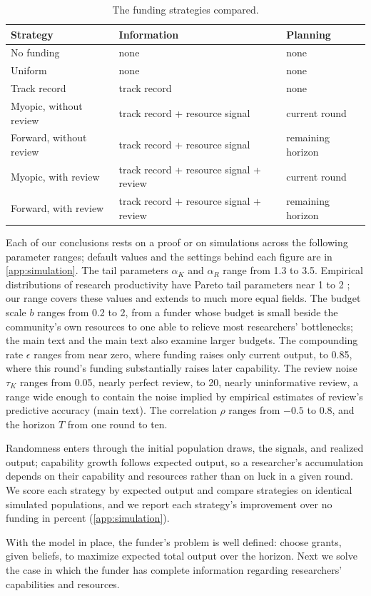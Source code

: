 \begin{table}[t]
\centering
\footnotesize
\setlength{\tabcolsep}{4pt}
\begin{tabular*}{\textwidth}{@{\extracolsep{\fill}}lll@{}}
\toprule
Strategy & Information & Planning \\
\midrule
No funding & none & none \\
Uniform & none & none \\
Track record & track record & none \\
Myopic, without review & track record + resource signal & current round \\
Forward, without review & track record + resource signal & remaining horizon \\
Myopic, with review & track record + resource signal + review & current round \\
Forward, with review & track record + resource signal + review & remaining horizon \\
\bottomrule
\end{tabular*}
\caption{The funding strategies compared.}
\label{tab:strategies}
\end{table}

Each of our conclusions rests on a proof or on simulations across the following parameter ranges; default values and the settings behind each figure are in \ref{app:simulation}. The tail parameters $\alpha_K$ and $\alpha_R$ range from 1.3 to 3.5. Empirical distributions of research productivity have Pareto tail parameters near 1 to 2 \citep{Lotka1926, Nicholls1989}; %
our range covers these values and extends to much more equal fields. The budget scale $b$ ranges from 0.2 to 2, from a funder whose budget is small beside the community's own resources to one able to relieve most researchers' bottlenecks; the main text and the main text also examine larger budgets. The compounding rate $\epsilon$ ranges from near zero, where funding raises only current output, to 0.85, where this round's funding substantially raises later capability. The review noise $\tau_K$ ranges from 0.05, nearly perfect review, to 20, nearly uninformative review, a range wide enough to contain the noise implied by empirical estimates of review's predictive accuracy (main text). The correlation $\rho$ ranges from $-0.5$ to 0.8, and the horizon $T$ from one round to ten.

Randomness enters through the initial population draws, the signals, and realized output; capability growth follows expected output, so a researcher's accumulation depends on their capability and resources rather than on luck in a given round. We score each strategy by expected output and compare strategies on identical simulated populations, and we report each strategy's improvement over no funding in percent (\ref{app:simulation}).

With the model in place, the funder's problem is well defined: choose grants, given beliefs, to maximize expected total output over the horizon. Next we solve the case in which the funder has complete information regarding researchers' capabilities and resources.
